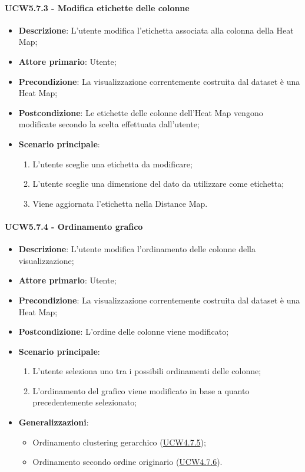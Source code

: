 \paragraph{UCW5.7.3 - Modifica etichette delle colonne}
\label{par:ucw5.7.3}
\begin{itemize}
    \item \textbf{Descrizione}:     L'utente modifica l'etichetta associata alla colonna della Heat Map;
    \item \textbf{Attore primario}: Utente;
    \item \textbf{Precondizione}:   La visualizzazione correntemente costruita dal dataset è una Heat Map;
    \item \textbf{Postcondizione}:  Le etichette delle colonne dell'Heat Map vengono modificate secondo la scelta effettuata dall'utente;
    \item \textbf{Scenario principale}:
          \begin{enumerate}
              \item L'utente sceglie una etichetta da modificare;
              \item L'utente sceglie una dimensione del dato da utilizzare come etichetta;
              \item Viene aggiornata l'etichetta nella Distance Map.
          \end{enumerate}
\end{itemize}

\paragraph{UCW5.7.4 - Ordinamento grafico}
\label{par:ucw5.7.4}
\begin{itemize}
    \item \textbf{Descrizione}:     L'utente modifica l'ordinamento delle colonne della visualizzazione;
    \item \textbf{Attore primario}: Utente;
    \item \textbf{Precondizione}:   La visualizzazione correntemente costruita dal dataset è una Heat Map;
    \item \textbf{Postcondizione}:  L'ordine delle colonne viene modificato;
    \item \textbf{Scenario principale}:
          \begin{enumerate}
              \item L'utente seleziona uno tra i possibili ordinamenti delle colonne;
              \item L'ordinamento del grafico viene modificato in base a quanto precedentemente selezionato;
          \end{enumerate}
    \item \textbf{Generalizzazioni}:
          \begin{itemize}
              \item Ordinamento clustering gerarchico (\hyperref[spar:ucw4.7.5]{UCW4.7.5});
              \item Ordinamento secondo ordine originario (\hyperref[spar:ucw4.7.6]{UCW4.7.6}).
          \end{itemize}
\end{itemize}

